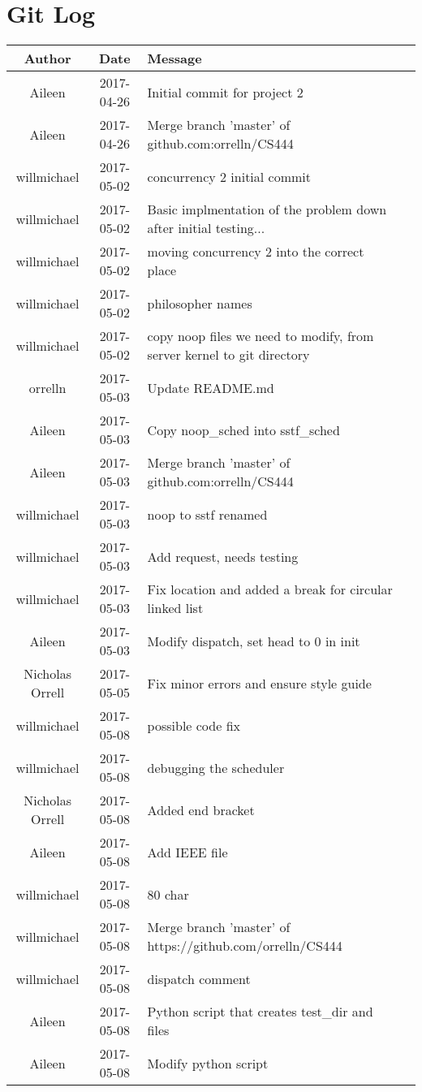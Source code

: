 \documentclass[draftclsnofoot, onecolumn]{IEEEtran}
\begin{document}
\section{Git Log}
\begin{center}
\begin{tabular} { |c|c|l|c|}
    \hline
\bf Author & \bf Date & \bf Message \\ \hline
Aileen & 2017-04-26 & Initial commit for project 2 \\ \hline
Aileen & 2017-04-26 & Merge branch 'master' of github.com:orrelln/CS444 \\ \hline
willmichael & 2017-05-02 & concurrency 2 initial commit \\ \hline
willmichael & 2017-05-02 & Basic implmentation of the problem down after initial testing... \\ \hline
willmichael & 2017-05-02 & moving concurrency 2 into the correct place \\ \hline
willmichael & 2017-05-02 & philosopher names \\ \hline
willmichael & 2017-05-02 & copy noop files we need to modify, from server kernel to git directory \\ \hline
orrelln & 2017-05-03 & Update README.md \\ \hline
Aileen & 2017-05-03 & Copy noop\_sched into sstf\_sched \\ \hline
Aileen & 2017-05-03 & Merge branch 'master' of github.com:orrelln/CS444 \\ \hline
willmichael & 2017-05-03 & noop to sstf renamed \\ \hline
willmichael & 2017-05-03 & Add request, needs testing \\ \hline
willmichael & 2017-05-03 & Fix location and added a break for circular linked list \\ \hline
Aileen & 2017-05-03 & Modify dispatch, set head to 0 in init \\ \hline
Nicholas Orrell & 2017-05-05 & Fix minor errors and ensure style guide \\ \hline
willmichael & 2017-05-08 & possible code fix \\ \hline
willmichael & 2017-05-08 & debugging the scheduler \\ \hline
Nicholas Orrell & 2017-05-08 & Added end bracket \\ \hline
Aileen & 2017-05-08 & Add IEEE file \\ \hline
willmichael & 2017-05-08 & 80 char \\ \hline
willmichael & 2017-05-08 & Merge branch 'master' of https://github.com/orrelln/CS444 \\ \hline
willmichael & 2017-05-08 & dispatch comment \\ \hline
Aileen & 2017-05-08 & Python script that creates test\_dir and files \\ \hline
Aileen & 2017-05-08 & 	Modify python script
\\\hline
\end{tabular}
\end{center}
\end{document}
